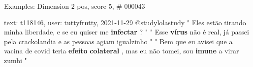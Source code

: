 \begin{frame}{Examples: Dimension 2 pos, score 5, \# 000043}
\footnotesize
\begin{exampleblock}{text: t118146, user: tuttyfrutty, 2021-11-29}
@studylolastudy " Eles estão tirando minha liberdade, e se eu quiser me 
\textbf{infectar} ? " " Esse \textbf{vírus} não é real, já passei pela 
crackolandia e as pessoas agiam igualzinho " " Bem que eu avisei que a vacina 
de covid teria \textbf{efeito} \textbf{colateral} , mas eu não tomei, sou 
\textbf{imune} a virar zumbi " 
\end{exampleblock}
\end{frame}
